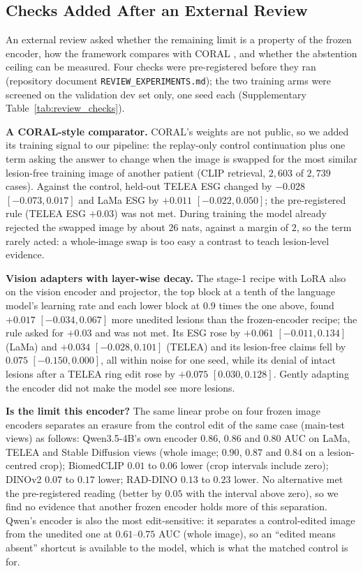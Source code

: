 \documentclass[journal]{IEEEtran}
\begin{document}
\subsection{Checks Added After an External Review}
\label{subsec:exp_review}
An external review asked whether the remaining limit is a property of the frozen encoder, how the framework compares with CORAL \citep{zafar2026coral}, and whether the abstention ceiling can be measured. Four checks were pre-registered before they ran (repository document \texttt{REVIEW\_EXPERIMENTS.md}); the two training arms were screened on the validation dev set only, one seed each (Supplementary Table~\ref{tab:review_checks}).

\textbf{A CORAL-style comparator.} CORAL's weights are not public, so we added its training signal to our pipeline: the replay-only control continuation plus one term asking the answer to change when the image is swapped for the most similar lesion-free training image of another patient (CLIP retrieval, $2{,}603$ of $2{,}739$ cases). Against the control, held-out TELEA ESG changed by $-0.028$ $[-0.073, 0.017]$ and LaMa ESG by $+0.011$ $[-0.022, 0.050]$; the pre-registered rule (TELEA ESG $+0.03$) was not met. During training the model already rejected the swapped image by about $26$ nats, against a margin of $2$, so the term rarely acted: a whole-image swap is too easy a contrast to teach lesion-level evidence.

\textbf{Vision adapters with layer-wise decay.} The stage-1 recipe with LoRA also on the vision encoder and projector, the top block at a tenth of the language model's learning rate and each lower block at $0.9$ times the one above, found $+0.017$ $[-0.034, 0.067]$ more unedited lesions than the frozen-encoder recipe; the rule asked for $+0.03$ and was not met. Its ESG rose by $+0.061$ $[-0.011, 0.134]$ (LaMa) and $+0.034$ $[-0.028, 0.101]$ (TELEA) and its lesion-free claims fell by $0.075$ $[-0.150, 0.000]$, all within noise for one seed, while its denial of intact lesions after a TELEA ring edit rose by $+0.075$ $[0.030, 0.128]$. Gently adapting the encoder did not make the model see more lesions.

\textbf{Is the limit this encoder?} The same linear probe on four frozen image encoders separates an erasure from the control edit of the same case (main-test views) as follows: Qwen3.5-4B's own encoder $0.86$, $0.86$ and $0.80$ AUC on LaMa, TELEA and Stable Diffusion views (whole image; $0.90$, $0.87$ and $0.84$ on a lesion-centred crop); BiomedCLIP $0.01$ to $0.06$ lower (crop intervals include zero); DINOv2 $0.07$ to $0.17$ lower; RAD-DINO $0.13$ to $0.23$ lower. No alternative met the pre-registered reading (better by $0.05$ with the interval above zero), so we find no evidence that another frozen encoder holds more of this separation. Qwen's encoder is also the most edit-sensitive: it separates a control-edited image from the unedited one at $0.61$--$0.75$ AUC (whole image), so an ``edited means absent'' shortcut is available to the model, which is what the matched control is for.
\end{document}
